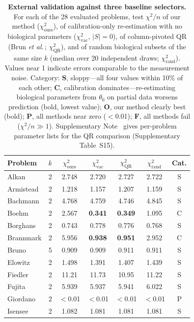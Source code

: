 \documentclass[pdflatex,sn-nature]{sn-jnl}
\theoremstyle{plain}
\begin{document}
\begin{table}[p]
\caption{\textbf{External validation against three baseline selectors.} For each of the 28 evaluated problems, test $\chi^2/n$ of our method ($\chi^2_{\mathrm{ours}}$), of calibration-only re-estimation with no biological parameters ($\chi^2_{\mathrm{vac}}$, $|S|=0$), of column-pivoted QR (Brun \emph{et al.}\,\cite{bib9}; $\chi^2_{\mathrm{QR}}$), and of random biological subsets of the same size $k$ (median over 20 independent draws; $\chi^2_{\mathrm{rand}}$). Values near 1 indicate errors comparable to the measurement noise. Category: \textbf{S}, sloppy---all four values within 10\% of each other; \textbf{C}, calibration dominates---re-estimating biological parameters from $\theta_0$ on partial data worsens prediction (bold, lowest value); \textbf{O}, our method clearly best (bold); \textbf{P}, all methods near zero ($<$0.01); \textbf{F}, all methods fail ($\chi^2/n\gg1$). Supplementary Note~\emph{} gives per-problem parameter lists for the QR comparison (Supplementary Table~S15).}
\label{tab:controls}
\centering
\scriptsize
\setlength{\tabcolsep}{3.5pt}
\renewcommand{\arraystretch}{0.88}
\begin{tabular}{@{}lrccccc@{}}
\toprule
Problem & $k$ & $\chi^2_{\mathrm{ours}}$ & $\chi^2_{\mathrm{vac}}$ & $\chi^2_{\mathrm{QR}}$ & $\chi^2_{\mathrm{rand}}$ & Cat. \\
\midrule
Alkan        & 2  & 2.748 & 2.720 & 2.727 & 2.722 & S \\
Armistead    & 2  & 1.218 & 1.157 & 1.207 & 1.159 & S \\
Bachmann     & 2  & 4.768 & 4.759 & 4.746 & 4.845 & S \\
Boehm        & 2  & 2.567 & \textbf{0.341} & \textbf{0.349} & 1.095 & C \\
Borghans     & 2  & 0.743 & 0.778 & 0.776 & 0.768 & S \\
Brannmark    & 2  & 5.956 & \textbf{0.938} & \textbf{0.951} & 2.952 & C \\
Bruno        & 5  & 0.909 & 0.909 & 0.911 & 0.911 & S \\
Elowitz      & 2  & 1.498 & 1.391 & 1.407 & 1.439 & S \\
Fiedler      & 2  & 11.21 & 11.73 & 10.95 & 11.22 & S \\
Fujita       & 2  & 5.939 & 5.937 & 5.941 & 6.022 & S \\
Giordano     & 2  & $<$0.01 & $<$0.01 & $<$0.01 & $<$0.01 & P \\
Isensee      & 2  & 1.082 & 1.081 & 1.081 & 1.081 & S \\

\end{tabular}
\end{table}
\end{document}
